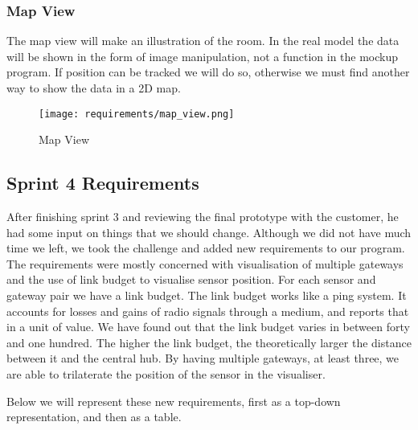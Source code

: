 \documentclass[../document]{subfiles}
\begin{document}
\newpage

\subsubsection{Map View}
The map view will make an illustration of the room. In the real model the data will be shown in the form of image manipulation, not a function in the mockup program. If position can be tracked we will do so, otherwise we must find another way to show the data in a 2D map.

\begin{figure}[H]
\centering
\texttt{[image: requirements/map\_view.png]}
\caption{Map View}
\end{figure}

\subsection{Sprint 4 Requirements}

After finishing sprint 3 and reviewing the final prototype with the customer, he had some input on things that we should change. Although we did not have much time we left, we took the challenge and added new requirements to our program. The requirements were mostly concerned with visualisation of multiple gateways and the use of link budget to visualise sensor position. For each sensor and gateway pair we have a link budget. The link budget works like a ping system. It accounts for losses and gains of radio signals through a medium, and reports that in a unit of value. We have found out that the link budget varies in between forty and one hundred. The higher the link budget, the theoretically larger the distance between it and the central hub. By having multiple gateways, at least three, we are able to trilaterate the position of the sensor in the visualiser.

Below we will represent these new requirements, first as a top-down representation, and then as a table.
\end{document}
